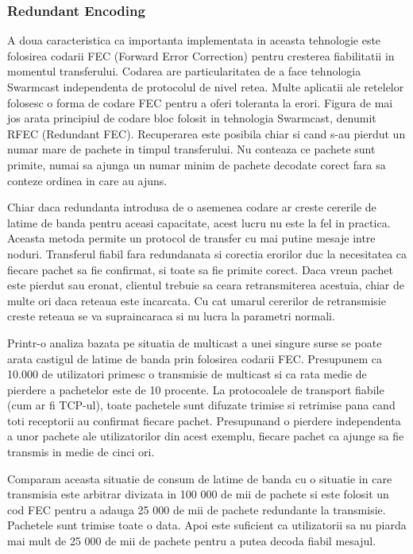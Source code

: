 \subsubsection{Redundant Encoding}

A doua caracteristica ca importanta implementata in aceasta tehnologie este
folosirea codarii FEC (Forward Error Correction) pentru cresterea fiabilitatii
in momentul transferului. Codarea are particularitatea de a face tehnologia
Swarmcast independenta de protocolul de nivel retea. 	Multe aplicatii ale
retelelor folosesc o forma de codare FEC pentru a oferi toleranta la erori.
Figura de mai jos arata principiul de codare bloc folosit in tehnologia
Swarmcast, denumit RFEC (Redundant FEC). Recuperarea este posibila chiar si
cand s-au pierdut un numar mare de pachete in timpul transferului. Nu conteaza
ce pachete sunt primite, numai sa ajunga un numar minim de pachete decodate
corect fara sa conteze ordinea in care au ajuns.

Chiar daca redundanta introdusa de o asemenea codare ar creste  cererile de
latime de  banda pentru aceasi capacitate, acest lucru nu este la fel in
practica. Aceasta metoda permite un protocol de transfer cu mai putine mesaje
intre noduri. Transferul fiabil fara redundanata si corectia erorilor duc la
necesitatea ca fiecare pachet sa fie confirmat, si toate sa fie primite
corect. Daca vreun pachet este pierdut sau eronat, clientul trebuie sa ceara
retransmiterea acestuia, chiar de multe ori daca reteaua este incarcata. Cu
cat umarul cererilor de retransmisie creste reteaua se va supraincaraca si nu
lucra la parametri normali.

Printr-o analiza bazata pe situatia de multicast a unei singure surse se poate
arata castigul de latime de banda prin folosirea codarii FEC. Presupunem ca
10.000 de utilizatori primesc o transmisie de multicast si ca rata medie de
pierdere a pachetelor este de 10 procente. La protocoalele de transport
fiabile (cum ar fi TCP-ul), toate pachetele sunt difuzate trimise si retrimise
pana cand toti receptorii au confirmat fiecare pachet. Presupunand o pierdere
independenta a unor pachete ale utilizatorilor din acest exemplu, fiecare
pachet ca ajunge sa fie transmis in medie de cinci ori.

Comparam aceasta situatie de consum de latime de banda cu o situatie in care
transmisia este arbitrar divizata in 100 000 de mii de pachete si este folosit
un cod FEC pentru a adauga 25 000 de mii de pachete redundante la transmisie.
Pachetele sunt trimise toate o data. Apoi este suficient ca utilizatorii sa nu
piarda mai mult de 25 000 de mii de pachete pentru a putea decoda fiabil
mesajul.

